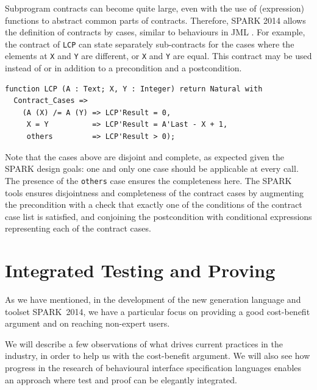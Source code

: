 \documentclass[sttt,final]{svjour}
\newcommand{\newspark}{SPARK~2014\xspace}
\begin{document}
Subprogram contracts can become quite large, even with the use of (expression)
functions to abstract common parts of contracts. Therefore, SPARK 2014 allows
the definition of contracts by cases, similar to behaviours in
JML \cite{JML}. For example, the contract of \verb|LCP| can state separately
sub-contracts for the cases where the elements at \verb|X| and \verb|Y| are
different, or \verb|X| and \verb|Y| are equal. This contract may be used
instead of or in addition to a precondition and a postcondition.
%
\begin{lstlisting}
function LCP (A : Text; X, Y : Integer) return Natural with
  Contract_Cases =>
    (A (X) /= A (Y) => LCP'Result = 0,
     X = Y          => LCP'Result = A'Last - X + 1,
     others         => LCP'Result > 0);
\end{lstlisting}
%
Note that the cases above are disjoint and complete, as expected given the
SPARK design goals: one and only one case should be applicable at every
call. The presence of the \verb|others| case ensures the completeness
here. The SPARK tools ensures disjointness and completeness of the contract
cases by augmenting the precondition with a check that exactly one of the
conditions of the contract case list is satisfied, and conjoining the
postcondition with conditional expressions representing each of the
contract cases.

\section{Integrated Testing and Proving}
\label{hilite}
As we have mentioned, in the development of the new generation
language and toolset \newspark, we have a particular focus on
providing a good cost-benefit argument and on reaching non-expert
users.

We will describe a few observations of what drives current practices
in the industry, in order to help us with the cost-benefit
argument. We will also see how progress in the research of behavioural
interface specification languages \cite{HatcliffLLMP12} enables an
approach where test and proof can be elegantly integrated.
\end{document}

